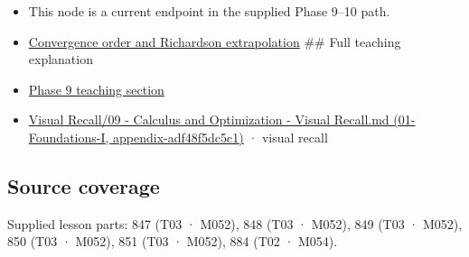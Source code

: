 \begin{itemize}
\item
  This node is a current endpoint in the supplied Phase 9--10 path.
\item
  \hyperref[appendix-aca80b6bf17a]{Convergence order and Richardson extrapolation} \#\# Full teaching explanation
\item
  \href{Continuous\%20Notes/Computing\%20Foundations\%20-\%20From\%20Bits\%20to\%20C++\%20and\%20Systems\%20APIs\#Numerical\%20differentiation\%20and\%20automatic\%20differentiation}{Phase 9 teaching section}
\item
  \href{}{Visual Recall/09 - Calculus and Optimization - Visual Recall.md (01-Foundations-I, appendix-adf48f5dc5c1)} · visual recall
\end{itemize}

\subsection{Source coverage}\label{source-coverage}

Supplied lesson parts: 847 (T03 · M052), 848 (T03 · M052), 849 (T03 · M052), 850 (T03 · M052), 851 (T03 · M052), 884 (T02 · M054).
